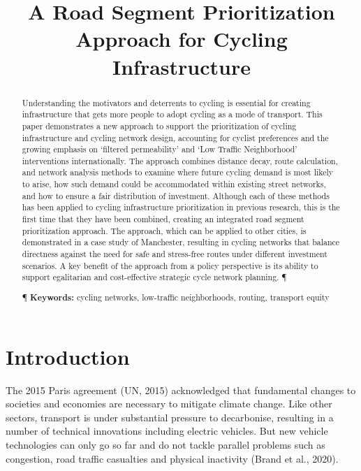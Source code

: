 \documentclass[
]{article}
\title{A Road Segment Prioritization Approach for Cycling Infrastructure}
\author{}
\date{\vspace{-2.5em}}
\begin{document}
\maketitle
\begin{abstract}
Understanding the motivators and deterrents to cycling is essential for creating infrastructure that gets more people to adopt cycling as a mode of transport. This paper demonstrates a new approach to support the prioritization of cycling infrastructure and cycling network design, accounting for cyclist preferences and the growing emphasis on `filtered permeability' and `Low Traffic Neighborhood' interventions internationally. The approach combines distance decay, route calculation, and network analysis methods to examine where future cycling demand is most likely to arise, how such demand could be accommodated within existing street networks, and how to ensure a fair distribution of investment. Although each of these methods has been applied to cycling infrastructure prioritization in previous research, this is the first time that they have been combined, creating an integrated road segment prioritization approach. The approach, which can be applied to other cities, is demonstrated in a case study of Manchester, resulting in cycling networks that balance directness against the need for safe and stress-free routes under different investment scenarios. A key benefit of the approach from a policy perspective is its ability to support egalitarian and cost-effective strategic cycle network planning. ¶ \par ¶ \textbf{Keywords:} cycling networks, low-traffic neighborhoods, routing, transport equity
\end{abstract}

\hypertarget{introduction}{%
\section{Introduction}\label{introduction}}

The 2015 Paris agreement (UN, 2015) acknowledged that
fundamental changes to societies and economies are necessary to mitigate
climate change. Like other sectors, transport is under substantial
pressure to decarbonise, resulting in a number of technical innovations
including electric vehicles. But new vehicle technologies can only go so
far and do not tackle parallel problems such as congestion, road traffic
casualties and physical inactivity (Brand et al., 2020).
\end{document}
